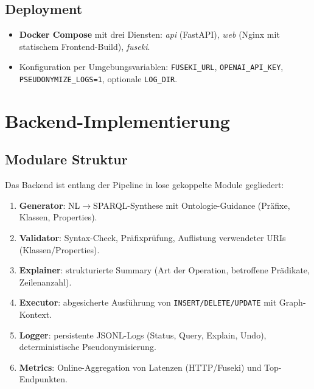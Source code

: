 \subsection*{Deployment}
\begin{itemize}
  \item \textbf{Docker Compose} mit drei Diensten: \emph{api} (FastAPI), \emph{web} (Nginx mit statischem Frontend-Build), \emph{fuseki}.
  \item Konfiguration per Umgebungsvariablen: \texttt{FUSEKI\_URL}, \texttt{OPENAI\_API\_KEY}, \texttt{PSEUDONYMIZE\_LOGS=1}, optionale \texttt{LOG\_DIR}.
\end{itemize}

\section{Backend-Implementierung}
\subsection{Modulare Struktur}
Das Backend ist entlang der Pipeline in lose gekoppelte Module gegliedert:
\begin{enumerate}
  \item \textbf{Generator}: NL$\rightarrow$SPARQL-Synthese mit Ontologie-Guidance (Präfixe, Klassen, Properties).
  \item \textbf{Validator}: Syntax-Check, Präfixprüfung, Auflistung verwendeter URIs (Klassen/Properties).
  \item \textbf{Explainer}: strukturierte Summary (Art der Operation, betroffene Prädikate, Zeilenanzahl).
  \item \textbf{Executor}: abgesicherte Ausführung von \texttt{INSERT/DELETE/UPDATE} mit Graph-Kontext.
  \item \textbf{Logger}: persistente JSONL-Logs (Status, Query, Explain, Undo), deterministische Pseudonymisierung.
  \item \textbf{Metrics}: Online-Aggregation von Latenzen (HTTP/Fuseki) und Top-Endpunkten.
\end{enumerate}

